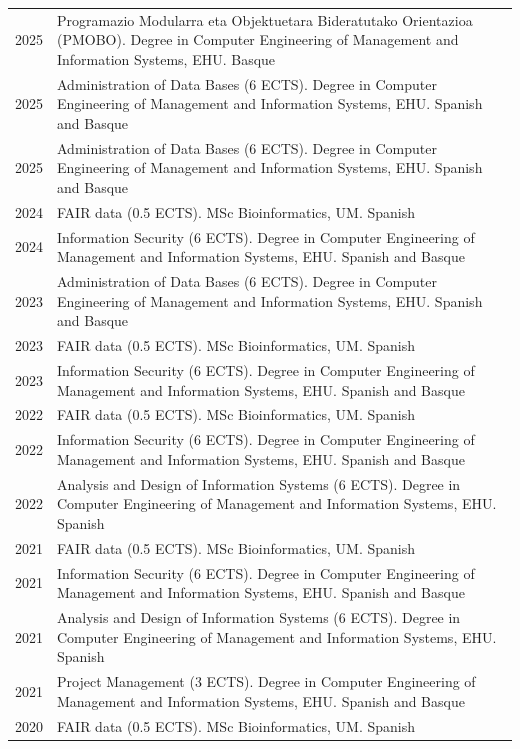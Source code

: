 \documentclass[11pt,fullpage]{article}
\begin{document}
\begin{longtable}{p{0.5in}|p{5.5in}}
2025 & Programazio Modularra eta Objektuetara Bideratutako Orientazioa (PMOBO). Degree in Computer Engineering of Management and Information Systems, EHU. Basque \\  
2025 & Administration of Data Bases (6 ECTS). Degree in Computer Engineering of Management and Information Systems, EHU. Spanish and Basque \\
2025 & Administration of Data Bases (6 ECTS). Degree in Computer Engineering of Management and Information Systems, EHU. Spanish and Basque \\
2024 & FAIR data (0.5 ECTS). MSc Bioinformatics, UM. Spanish \\
2024 & Information Security (6 ECTS). Degree in Computer Engineering of Management and Information Systems, EHU. Spanish and Basque \\
2023 & Administration of Data Bases (6 ECTS). Degree in Computer Engineering of Management and Information Systems, EHU. Spanish and Basque \\
2023 & FAIR data (0.5 ECTS). MSc Bioinformatics, UM. Spanish \\
2023 & Information Security (6 ECTS). Degree in Computer Engineering of Management and Information Systems, EHU. Spanish and Basque \\
2022 & FAIR data (0.5 ECTS). MSc Bioinformatics, UM. Spanish \\
2022 & Information Security (6 ECTS). Degree in Computer Engineering of Management and Information Systems, EHU. Spanish and Basque \\
2022 & Analysis and Design of Information Systems (6 ECTS). Degree in Computer Engineering of Management and Information Systems, EHU. Spanish \\  
2021 & FAIR data (0.5 ECTS). MSc Bioinformatics, UM. Spanish \\
2021 & Information Security (6 ECTS). Degree in Computer Engineering of Management and Information Systems, EHU. Spanish and Basque \\
2021 & Analysis and Design of Information Systems (6 ECTS). Degree in Computer Engineering of Management and Information Systems, EHU. Spanish \\
2021 & Project Management (3 ECTS). Degree in Computer Engineering of Management and Information Systems, EHU. Spanish and Basque \\
2020 & FAIR data (0.5 ECTS). MSc Bioinformatics, UM. Spanish \\

\end{longtable}
\end{document}
